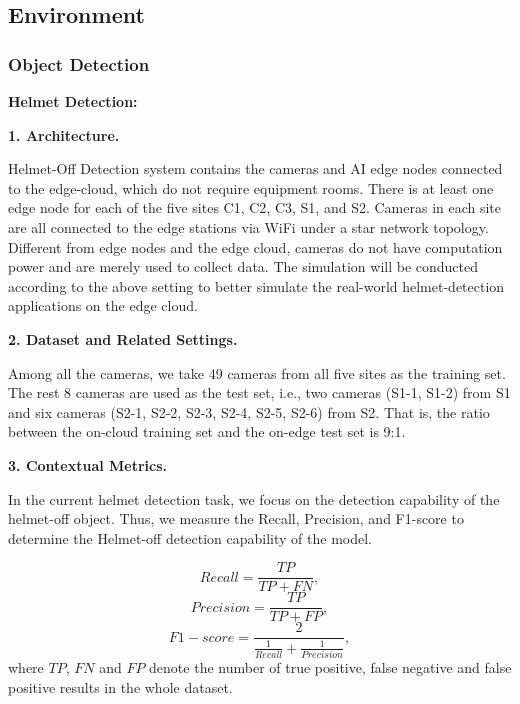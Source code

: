 

\subsection{Environment}


\subsubsection{Object Detection}
\textbf{Helmet Detection:} 

\textbf{1. Architecture.} 

Helmet-Off Detection system contains the cameras and AI edge nodes connected to the edge-cloud, which do not require equipment rooms. There is at least one edge node for each of the five sites C1, C2, C3, S1, and S2. Cameras in each site are all connected to the edge stations via WiFi under a star network topology. Different from edge nodes and the edge cloud, cameras do not have computation power and are merely used to collect data. The simulation will be conducted according to the above setting to better simulate the real-world helmet-detection applications on the edge cloud.

\textbf{2. Dataset and Related Settings.} 

Among all the cameras, we take 49 cameras from all five sites as the training set. The rest 8 cameras are used as the test set, i.e., two cameras (S1-1, S1-2) from S1 and six cameras (S2-1, S2-2, S2-3, S2-4, S2-5, S2-6) from S2. That is, the ratio between the on-cloud training set and the on-edge test set is 9:1. 

\textbf{3. Contextual Metrics.} 

In the current helmet detection task, we focus on the detection capability of the helmet-off object. Thus, we measure the Recall, Precision, and F1-score to determine the Helmet-off detection capability of the model. 

\begin{equation} \label{equ:recall} 
Recall = \frac{TP}{TP + FN}, 
\end{equation}
\begin{equation} \label{equ:precision} 
Precision = \frac{TP}{TP + FP}, 
\end{equation}
\begin{equation} \label{equ:f1} 
F1-score = \frac{ 2 } {\frac{1}{Recall} + \frac{1}{Precision}},
\end{equation}
where $TP$, $FN$ and $FP$ denote the number of true positive, false negative and false positive results in the whole dataset. 

